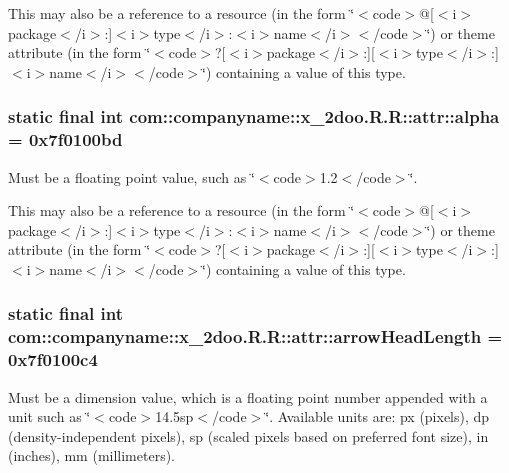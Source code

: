 This may also be a reference to a resource (in the form \char`\"{}$<$code$>$@\mbox{[}$<$i$>$package$<$/i$>$:\mbox{]}$<$i$>$type$<$/i$>$:$<$i$>$name$<$/i$>$$<$/code$>$\char`\"{}) or theme attribute (in the form \char`\"{}$<$code$>$?\mbox{[}$<$i$>$package$<$/i$>$:\mbox{]}\mbox{[}$<$i$>$type$<$/i$>$:\mbox{]}$<$i$>$name$<$/i$>$$<$/code$>$\char`\"{}) containing a value of this type. \hypertarget{classcom_1_1companyname_1_1x__2doo_1_1_r_1_1attr_da10ad1a9a8bf2498c223cc9bf101935}{
\subsubsection[{alpha}]{\setlength{\rightskip}{0pt plus 5cm}static final int com::companyname::x\_\-2doo.R.R::attr::alpha = 0x7f0100bd}}
\label{classcom_1_1companyname_1_1x__2doo_1_1_r_1_1attr_da10ad1a9a8bf2498c223cc9bf101935}


Must be a floating point value, such as \char`\"{}$<$code$>$1.2$<$/code$>$\char`\"{}. 

This may also be a reference to a resource (in the form \char`\"{}$<$code$>$@\mbox{[}$<$i$>$package$<$/i$>$:\mbox{]}$<$i$>$type$<$/i$>$:$<$i$>$name$<$/i$>$$<$/code$>$\char`\"{}) or theme attribute (in the form \char`\"{}$<$code$>$?\mbox{[}$<$i$>$package$<$/i$>$:\mbox{]}\mbox{[}$<$i$>$type$<$/i$>$:\mbox{]}$<$i$>$name$<$/i$>$$<$/code$>$\char`\"{}) containing a value of this type. \hypertarget{classcom_1_1companyname_1_1x__2doo_1_1_r_1_1attr_a124af75ac2b3ab12d263ba36870a259}{
\subsubsection[{arrowHeadLength}]{\setlength{\rightskip}{0pt plus 5cm}static final int com::companyname::x\_\-2doo.R.R::attr::arrowHeadLength = 0x7f0100c4}}
\label{classcom_1_1companyname_1_1x__2doo_1_1_r_1_1attr_a124af75ac2b3ab12d263ba36870a259}


Must be a dimension value, which is a floating point number appended with a unit such as \char`\"{}$<$code$>$14.5sp$<$/code$>$\char`\"{}. Available units are: px (pixels), dp (density-independent pixels), sp (scaled pixels based on preferred font size), in (inches), mm (millimeters). 

